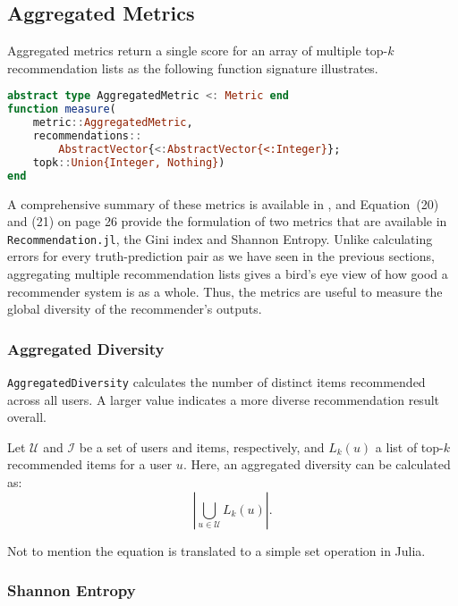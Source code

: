\subsection{Aggregated Metrics}
\label{sec:aggregated-metrics}

Aggregated metrics return a single score for an array of multiple top-$k$ recommendation lists as the following function signature illustrates. 

\begin{lstlisting}[language = Julia]
abstract type AggregatedMetric <: Metric end
function measure(
    metric::AggregatedMetric, 
    recommendations::
        AbstractVector{<:AbstractVector{<:Integer}}; 
    topk::Union{Integer, Nothing})
end
\end{lstlisting}

A comprehensive summary of these metrics is available in \cite{shani2011evaluating}, and Equation~(20) and (21) on page 26 provide the formulation of two metrics that are available in \texttt{Recommendation.jl}, the Gini index and Shannon Entropy. Unlike calculating errors for every truth-prediction pair as we have seen in the previous sections, aggregating multiple recommendation lists gives a bird's eye view of how good a recommender system is as a whole. Thus, the metrics are useful to measure the global diversity of the recommender's outputs.

\subsubsection{Aggregated Diversity}

\texttt{AggregatedDiversity} calculates the number of distinct items recommended across all users. A larger value indicates a more diverse recommendation result overall.

Let $\mathcal{U}$ and $\mathcal{I}$ be a set of users and items, respectively, and $L_k(u)$ a list of top-$k$ recommended items for a user $u$. Here, an aggregated diversity can be calculated as:
\begin{equation*}
\left| \bigcup\limits_{u \in \mathcal{U}} L_k(u) \right|.
\end{equation*}

Not to mention the equation is translated to a simple set operation in Julia.

\subsubsection{Shannon Entropy}

